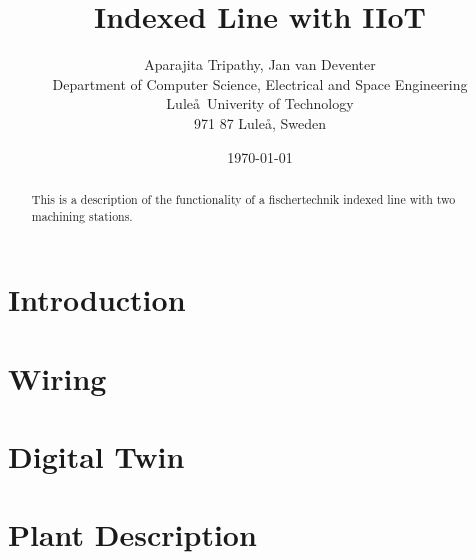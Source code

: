 \documentclass[12pt]{article}
\title{Indexed Line with IIoT}
\author{Aparajita Tripathy, Jan van Deventer \\Department of Computer Science, Electrical and Space Engineering\\Lule\aa\ Univerity of Technology \\ 971 87 Lule\aa, Sweden}
\date{\today}
\begin{document}
\maketitle

\begin{abstract}
This is a description of the functionality of a fischertechnik indexed line with two machining stations.
\end{abstract}

\section{Introduction}


\section{Wiring}


\section{Digital Twin}

\section{Plant Description}

%
%
\end{document}
